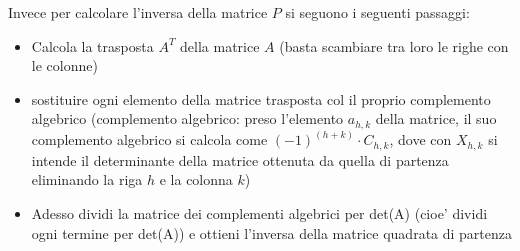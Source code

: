 \newline
Invece per calcolare l'inversa della matrice $P$ si seguono i seguenti passaggi:
\begin{itemize}
    \item Calcola la trasposta $A^T$ della matrice $A$ (basta scambiare tra loro le righe con le colonne)
    \item sostituire ogni elemento della matrice trasposta col il proprio complemento algebrico (complemento algebrico: preso l'elemento $a_{h,k}$ della matrice, il suo complemento algebrico si calcola come $(-1)^{(h+k)}\cdot C_{h,k}$, dove con $X_{h,k}$ si intende il determinante della matrice ottenuta da quella di partenza eliminando la riga $h$ e la colonna $k$)
    \item Adesso dividi la matrice dei complementi algebrici per det(A) (cioe' dividi ogni termine per det(A)) e ottieni l'inversa della matrice quadrata di partenza
\end{itemize}